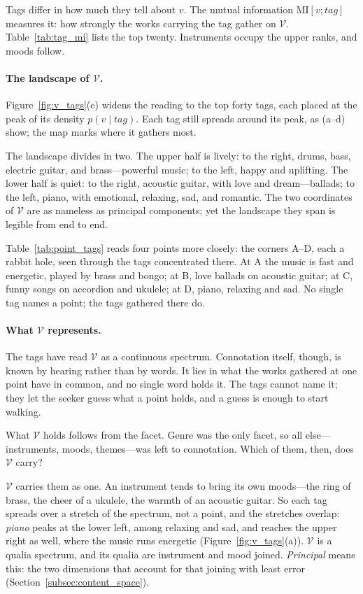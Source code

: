 Tags differ in how much they tell about $v$. The mutual information
$\mathrm{MI}[v; \textit{tag}]$ measures it: how strongly the works carrying the
tag gather on $\mathcal{V}$. Table~\ref{tab:tag_mi} lists the top twenty.
Instruments occupy the upper ranks, and moods follow.

\paragraph{The landscape of $\mathcal{V}$.}
Figure~\ref{fig:v_tags}(e) widens the reading to the top forty tags,
each placed at the peak of its density $p(v \mid \textit{tag})$. Each
tag still spreads around its peak, as (a--d) show; the map marks
where it gathers most.

The landscape divides in two. The upper half is lively: to the right, drums,
bass, electric guitar, and brass---powerful music; to the left, happy and
uplifting. The lower half is quiet: to the right, acoustic guitar, with love and
dream---ballads; to the left, piano, with emotional, relaxing, sad, and
romantic. The two coordinates of $\mathcal{V}$ are as nameless as principal
components; yet the landscape they span is legible from end to end.

Table~\ref{tab:point_tags} reads four points more closely: the
corners A--D, each a rabbit hole, seen through the tags concentrated
there. At A the music is fast and energetic, played by brass and
bongo; at B, love ballads on acoustic guitar; at C, funny songs on
accordion and ukulele; at D, piano, relaxing and sad. No single tag
names a point; the tags gathered there do.

\paragraph{What $\mathcal{V}$ represents.}
The tags have read $\mathcal{V}$ as a continuous spectrum. Connotation
itself, though, is known by hearing rather than by words. It lies in
what the works gathered at one point have in common, and no single
word holds it. The tags cannot name it; they let the seeker guess what
a point holds, and a guess is enough to start walking.

What $\mathcal{V}$ holds follows from the facet. Genre was the only
facet, so all else---instruments, moods, themes---was left to
connotation. Which of them, then, does $\mathcal{V}$ carry?

$\mathcal{V}$ carries them as one. An instrument tends to bring
its own moods---the ring of brass, the cheer of a ukulele, the warmth of an
acoustic guitar. So each tag spreads over a stretch of the spectrum, not a
point, and the stretches overlap: \textit{piano} peaks at the lower left, among
relaxing and sad, and reaches the upper right as well, where the music runs
energetic (Figure~\ref{fig:v_tags}(a)). $\mathcal{V}$ is a qualia spectrum, and
its qualia are instrument and mood joined. \textit{Principal} means this: the
two dimensions that account for that joining with least error
(Section~\ref{subsec:content_space}).

